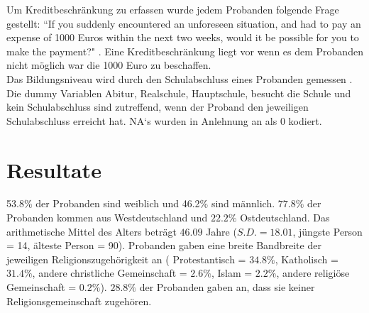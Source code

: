 \documentclass[11pt,a4paper]{article}
\begin{document}
Um Kreditbeschränkung zu erfassen wurde jedem Probanden folgende Frage gestellt: “If you suddenly encountered an unforeseen situation, and had to pay an expense of 1000 Euros within the next two weeks, would it be possible for you to make the payment?" \parencite{dohmen2012interpreting}. Eine Kreditbeschränkung liegt vor wenn es dem Probanden nicht möglich war die 1000 Euro zu beschaffen. \\ 

Das Bildungsniveau wird durch den Schulabschluss eines Probanden gemessen \parencite{dohmen2010risk}. Die dummy Variablen Abitur, Realschule, Hauptschule, besucht die Schule und kein Schulabschluss sind zutreffend, wenn der Proband den jeweiligen Schulabschluss erreicht hat. NA`s wurden in Anlehnung an \textcite{dohmen2010risk} als 0 kodiert.\\









  


\section{Resultate}
53.8\% der Probanden sind weiblich und 46.2\% sind männlich.  $77.8\%$ der Probanden kommen aus Westdeutschland und $22.2\%$ Ostdeutschland. Das arithmetische Mittel des Alters beträgt $46.09$ Jahre ($S.D. = 18.01$,  jüngste Person = 14, älteste Person = 90). Probanden gaben eine breite Bandbreite der jeweiligen Religionszugehörigkeit an ( Protestantisch = $34.8\%$, Katholisch = $31.4\%$, andere christliche Gemeinschaft = $2.6\%$, Islam = $2.2\%$, andere religiöse Gemeinschaft = $0.2\%$). $28.8\%$ der Probanden gaben an, dass sie keiner Religionsgemeinschaft zugehören.
\end{document}
